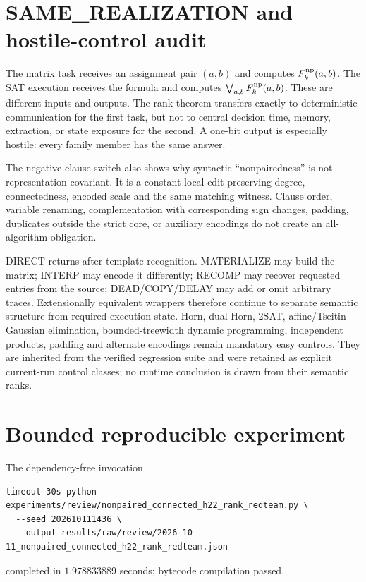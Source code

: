 \documentclass[11pt]{article}
\begin{document}
\section{SAME\_REALIZATION and hostile-control audit}

The matrix task receives an assignment pair $(a,b)$ and computes
$F_k^{\rm np}(a,b)$.  The SAT execution receives the formula and computes
$\bigvee_{a,b}F_k^{\rm np}(a,b)$.  These are different inputs and outputs.
The rank theorem transfers exactly to deterministic communication for the
first task, but not to central decision time, memory, extraction, or state
exposure for the second.  A one-bit output is especially hostile: every
family member has the same answer.

The negative-clause switch also shows why syntactic ``nonpairedness'' is not
representation-covariant.  It is a constant local edit preserving degree,
connectedness, encoded scale and the same matching witness.  Clause order,
variable renaming, complementation with corresponding sign changes, padding,
duplicates outside the strict core, or auxiliary encodings do not create an
all-algorithm obligation.

DIRECT returns after template recognition.  MATERIALIZE may build the
matrix; INTERP may encode it differently; RECOMP may recover requested
entries from the source; DEAD/COPY/DELAY may add or omit arbitrary traces.
Extensionally equivalent wrappers therefore continue to separate semantic
structure from required execution state.  Horn, dual-Horn, 2SAT,
affine/Tseitin Gaussian elimination, bounded-treewidth dynamic programming,
independent products, padding and alternate encodings remain mandatory easy
controls.  They are inherited from the verified regression suite and were
retained as explicit current-run control classes; no runtime conclusion is
drawn from their semantic ranks.

\section{Bounded reproducible experiment}

The dependency-free invocation
\begin{verbatim}
timeout 30s python experiments/review/nonpaired_connected_h22_rank_redteam.py \
  --seed 202610111436 \
  --output results/raw/review/2026-10-11_nonpaired_connected_h22_rank_redteam.json
\end{verbatim}
completed in $1.978833889$ seconds; bytecode compilation passed.
\end{document}

